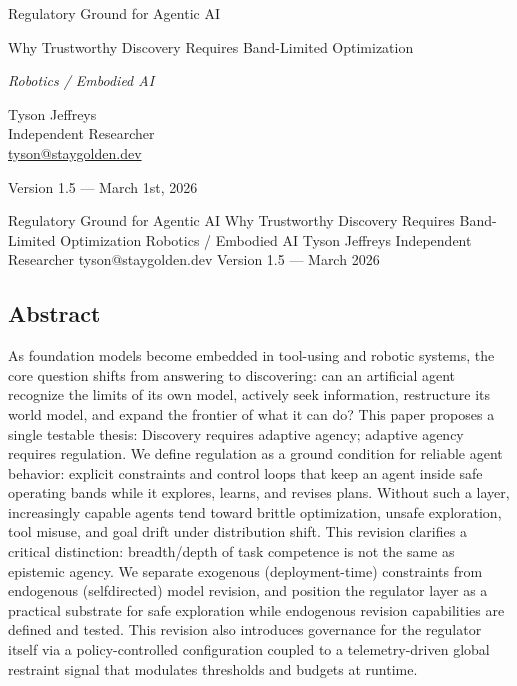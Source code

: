 \documentclass[11pt]{article}
\begin{document}
\begin{titlepage}
\thispagestyle{empty}
\raggedright

\vspace*{0.62\textheight}

{\LARGE Regulatory Ground for Agentic AI\par}
\vspace{0.25em}
{\Large Why Trustworthy Discovery Requires Band-Limited Optimization\par}
\vspace{0.4em}
{\large\itshape Robotics / Embodied AI\par}

\vspace{1.6em}

Tyson Jeffreys\\
Independent Researcher\\
\href{mailto:tyson@staygolden.dev}{tyson@staygolden.dev}

\vspace{1.6em}

Version 1.5 --- March 1st, 2026

\end{titlepage}


\vspace{1em}

\setcounter{section}{0}

Regulatory Ground for Agentic AI
Why Trustworthy Discovery Requires Band-Limited Optimization
Robotics / Embodied AI
Tyson Jeffreys
Independent Researcher
tyson@staygolden.dev
Version 1.5 — March 2026
\subsection{Abstract}
As foundation models become embedded in tool-using and robotic systems, the core question shifts
from answering to discovering: can an artificial agent recognize the limits of its own model, actively
seek information, restructure its world model, and expand the frontier of what it can do?
This paper proposes a single testable thesis:
Discovery requires adaptive agency; adaptive agency requires regulation.
We define regulation as a ground condition for reliable agent behavior: explicit constraints and
control loops that keep an agent inside safe operating bands while it explores, learns, and revises
plans. Without such a layer, increasingly capable agents tend toward brittle optimization, unsafe
exploration, tool misuse, and goal drift under distribution shift.
This revision clarifies a critical distinction: breadth/depth of task competence is not the same
as epistemic agency. We separate exogenous (deployment-time) constraints from endogenous (selfdirected) model revision, and position the regulator layer as a practical substrate for safe exploration
while endogenous revision capabilities are defined and tested. This revision also introduces governance
for the regulator itself via a policy-controlled configuration coupled to a telemetry-driven global
restraint signal that modulates thresholds and budgets at runtime.
\end{document}
